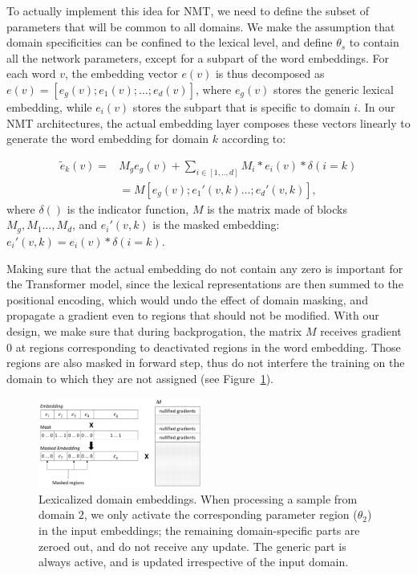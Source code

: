 \documentclass[a4paper]{article}
\begin{document}
To actually implement this idea for NMT, we need to define the subset of parameters that will be common to all domains. 
We make the assumption that domain specificities can be confined to the lexical level, and define $\theta_s$ to contain all the network parameters, except for a subpart of the word embeddings. 
For each word $v$, the embedding vector $e(v)$ is thus decomposed as $e(v) = [e_g(v); e_1(v); \dots; e_d(v)]$, where $e_g(v)$ stores the generic lexical embedding, while $e_i(v)$ stores the subpart that is specific to domain $i$.
In our NMT architectures, the actual embedding layer composes these vectors linearly to generate the word embedding for domain $k$ according to:

\begin{align}
  \tilde{e}_k(v) =& M_g e_g(v) + \sum_{i \in [1,..,d]} M_i * e_i(v) * \delta(i=k) \nonumber \\
   & = M [e_g(v); e_1'(v,k) \dots; e_d'(v,k)], \label{eq:embedding}
\end{align}
where $\delta()$ is the indicator function, $M$ is the matrix made of blocks $M_g, M_1 \dots, M_d$, and $e_i'(v,k)$ is the masked embedding: $e_i'(v,k)= e_i(v) * \delta(i=k)$.  

Making sure that the actual embedding do not contain any zero is important for the Transformer model, since the lexical representations are then summed to the positional encoding, which would undo the effect of domain masking, and propagate a gradient even to regions that should not be modified. 
With our design, we make sure that during backprogation, the matrix $M$ receives gradient $0$ at regions corresponding to deactivated regions in the word embedding. 
Those regions are also masked in forward step, thus do not interfere the training on the domain to which they are not assigned (see Figure~\ref{fig:network}).

\begin{figure}[h]
  \center
  \includegraphics[width=0.48\textwidth]{embeddings}
  \caption{Lexicalized domain embeddings. When processing a sample from domain $2$, we only activate the corresponding parameter region ($\theta_2$) in the input embeddings; the remaining domain-specific parts are zeroed out, and do not receive any update. The generic part is always active, and is updated irrespective of the input domain.} 
  \label{fig:network}
\end{figure}
\end{document}
